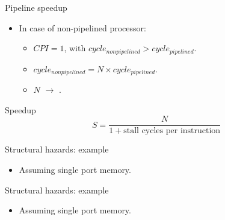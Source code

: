 \begin{frame}[t]{Pipeline speedup}
\begin{itemize}
  \item In case of non-pipelined processor:
    \begin{itemize}
      \item $CPI=1$, with $cycle_{nonpipelined} > cycle_{pipelined}$.
      \item $cycle_{nonpipelined} = N \times cycle_{pipelined}$.
      \item $N$ $\rightarrow$ .
    \end{itemize}
\end{itemize}
\begin{block}{Speedup}
\[
S =
\frac{N}{1 + \text{stall cycles per instruction}}
\]
\end{block}
\end{frame}

\begin{frame}[t]{Structural hazards: example}
\makebox[\textwidth][c]{

}
\begin{itemize}
  \item Assuming single port memory.
\end{itemize}
\end{frame}

\begin{frame}[t]{Structural hazards: example}
\makebox[\textwidth][c]{

}
\begin{itemize}
  \item Assuming single port memory.
\end{itemize}
\end{frame}

